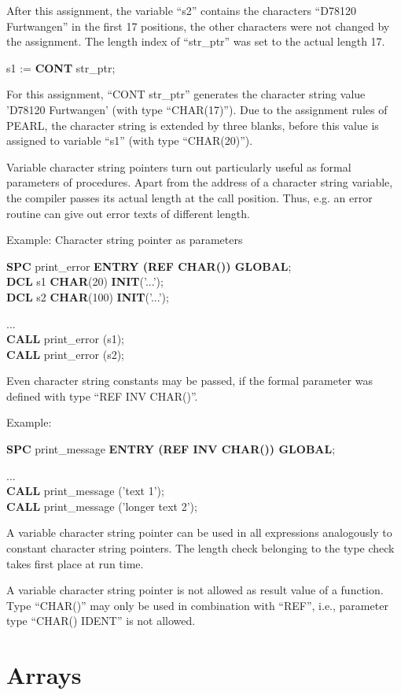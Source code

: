 After this assignment, the variable ``s2'' contains the characters
``D78120 Furtwangen'' in the first 17 positions, the other characters
were not changed by the assignment. The length index of ``str\_ptr'' was
set to the actual length 17.

s1 := {\bf CONT} str\_ptr;

For this assignment, ``CONT str\_ptr'' generates the character string
value 'D78120 Furtwangen' (with type ``CHAR(17)''). Due to the assignment
rules of PEARL, the character string is extended by three blanks, before
this value is assigned to variable ``s1'' (with type ``CHAR(20)'').

Variable character string pointers turn out particularly useful as
formal parameters of procedures. Apart from the address of a character
string variable, the compiler passes its actual length at the call
position.  Thus, e.g. an error routine can give out error texts of
different length.

Example: Character string pointer as parameters

{\bf SPC} print\_error {\bf ENTRY (REF CHAR()) GLOBAL};\\
{\bf DCL} s1 {\bf CHAR}(20)  {\bf INIT}('...');\\
{\bf DCL} s2 {\bf CHAR}(100) {\bf INIT}('...');

...\\
{\bf CALL} print\_error (s1);\\
{\bf CALL} print\_error (s2);

Even character string constants may be passed, if the formal parameter
was defined with type ``REF INV CHAR()''.

Example:

{\bf SPC} print\_message {\bf ENTRY (REF INV CHAR()) GLOBAL};

...\\
{\bf CALL} print\_message ('text 1');\\
{\bf CALL} print\_message ('longer text 2');

A variable character string pointer can be used in all expressions
analogously to constant character string pointers. The length check
belonging to the type check takes first place at run time.

A variable character string pointer is not allowed as result value of a
function. Type ``CHAR()'' may only be used in combination with ``REF'',
i.e., parameter type ``CHAR() IDENT'' is not allowed.

\section{Arrays}   %
\label{sec_array}

